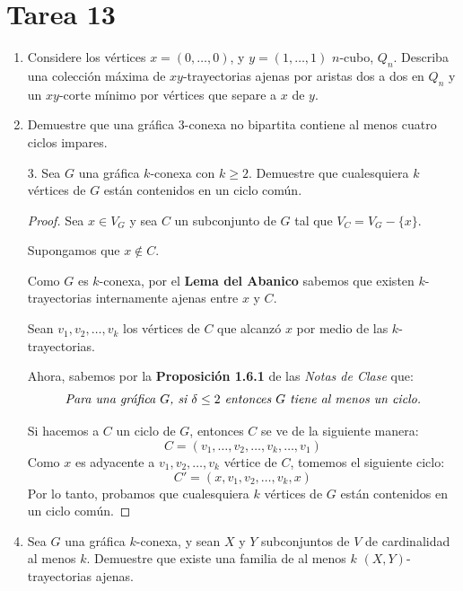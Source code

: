 \documentclass{article}
\begin{document}
\section*{\LARGE{Tarea 13}}
\begin{enumerate}
  \item Considere los v\'ertices $x = (0, \dots, 0)$, y $y = (1, \dots, 1)$
  $n$-cubo, $Q_n$.   Describa una colecci\'on m\'axima de $xy$-trayectorias
  ajenas por aristas dos a dos en $Q_n$ y un $xy$-corte m\'inimo por
  v\'ertices que separe a $x$ de $y$.

  \item Demuestre que una gr\'afica $3$-conexa no bipartita contiene al menos
  cuatro ciclos impares.

  \item[3.] Sea $G$ una gr\'afica $k$-conexa con $k \ge 2$.   Demuestre que
    cualesquiera $k$ v\'ertices de $G$ est\'an contenidos en un ciclo com\'un.

    \begin{proof}
      Sea $x \in V_{G}$ y sea $C$ un subconjunto de $G$ tal que $V_{C} = V_{G} - \{x\}$.

      Supongamos que $x \notin C$.

      Como $G$ es $k$-conexa, por el \textbf{Lema del Abanico} sabemos que existen $k$-trayectorias internamente ajenas entre $x$ y $C$.

      Sean $v_{1}, v_{2}, \dots, v_{k}$ los vértices de $C$ que alcanzó $x$ por medio de las $k$-trayectorias.

      Ahora, sabemos por la \textbf{Proposición 1.6.1} de las \textit{Notas de Clase} que:
      $$\text{\textit{Para una gráfica $G$, si $\delta \leq 2$ entonces $G$ tiene al menos un ciclo.}}$$

      Si hacemos a $C$ un ciclo de $G$, entonces $C$ se ve de la siguiente manera:
      $$C = (v_{1}, \dots, v_{2}, \dots, v_{k}, \dots, v_{1})$$
      Como $x$ es adyacente a $v_{1}, v_{2}, \dots, v_{k}$ vértice de $C$, tomemos el siguiente ciclo:
      $$C' = (x, v_{1}, v_{2}, \dots, v_{k}, x)$$
      Por lo tanto, probamos que cualesquiera $k$ vértices de $G$ están contenidos en un ciclo común.
    \end{proof}

  \item Sea $G$ una gr\'afica $k$-conexa, y sean $X$ y $Y$ subconjuntos de $V$
  de cardinalidad al menos $k$.   Demuestre que existe una familia de al menos
  $k$ $(X,Y)$-trayectorias ajenas.


\end{enumerate}
\end{document}
